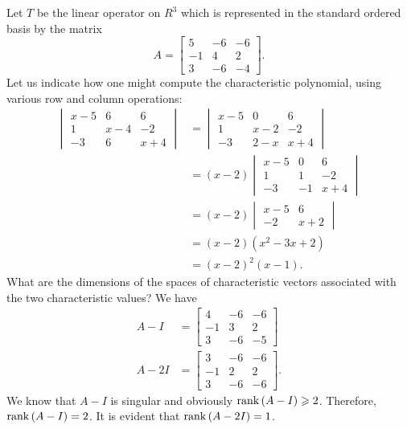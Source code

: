 \begin{example}\label{example:6.3}
    Let \(T\) be the linear operator on \(R^3\) which is represented in the standard ordered basis by the matrix
    \begin{equation*}
        A=
        \begin{bmatrix}
            5 & -6 & -6 \\
            -1 & 4 & 2 \\
            3 & -6 & -4
        \end{bmatrix}
        .
    \end{equation*}
    Let us indicate how one might compute the characteristic polynomial, using various row and column operations:
    \begin{align*}
        \begin{vmatrix}
            x-5 & 6 & 6 \\
            1 & x-4 & -2 \\
            -3 & 6 & x+4
        \end{vmatrix}
        &=
        \begin{vmatrix}
            x-5 & 0 & 6 \\
            1 & x-2 & -2 \\
            -3 & 2-x & x+4
        \end{vmatrix}
        \\
        &=\left(x-2\right)
        \begin{vmatrix}
            x-5 & 0 & 6 \\
            1 & 1 & -2 \\
            -3 & -1 & x+4
        \end{vmatrix}
        \\
        &=\left(x-2\right)
        \begin{vmatrix}
            x-5 & 6 \\
            -2 & x+2
        \end{vmatrix}
        \\
        &=\left(x-2\right)\left(x^2-3x+2\right)\\
        &=\left(x-2\right)^2\left(x-1\right).
    \end{align*}
    What are the dimensions of the spaces of characteristic vectors associated with the two characteristic values? We have
    \begin{align*}
        A-I&=
        \begin{bmatrix}
            4 & -6 & -6 \\
            -1 & 3 & 2 \\
            3 & -6 & -5
        \end{bmatrix}
        \\
        A-2I&=
        \begin{bmatrix}
            3 & -6 & -6 \\
            -1 & 2 & 2 \\
            3 & -6 & -6
        \end{bmatrix}
        .
    \end{align*}
    We know that \(A-I\) is singular and obviously \(\operatorname{rank}\left(A-I\right)\geqslant2\). Therefore, \(\operatorname{rank}\left(A-I\right)=2\). It is evident that \(\operatorname{rank}\left(A-2I\right)=1\).


\end{example}
